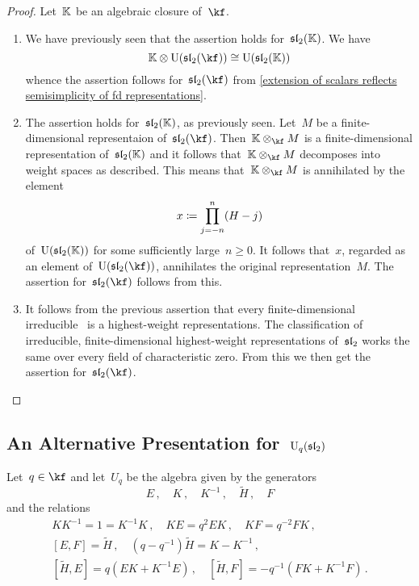 \documentclass[a4paper, 11pt, oneside]{scrartcl}
\begin{document}
\begin{proof}
  Let~$\mathbb{K}$ be an algebraic closure of~$\kf$.
  \begin{enumerate}
    \item
      We have previously seen that the assertion holds for~$\mathfrak{sl}_2(\mathbb{K})$.
      We have
      \[
        \Kf \tensor \Univ(\sllie_2(\kf))
        \cong
        \Univ(\sllie_2(\Kf))
      \]
      whence the assertion follows for~$\sllie_2(\kf)$ from \cref{extension of scalars reflects semisimplicity of fd representations}.
    \item
      The assertion holds for~$\mathfrak{sl}_2(\mathbb{K})$, as previously seen.
      Let~$M$ be a finite-dimensional representaion of~$\sllie_2(\kf)$.
      Then~$\Kf \tensor_{\kf} M$ is a finite-dimensional representation of~$\mathfrak{sl}_2(\mathbb{K})$ and it follows that~$\Kf \tensor_{\kf} M$ decomposes into weight spaces as described.
      This means that~$\Kf \tensor_{\kf} M$ is annihilated by the element
      \[
        x \coloneqq \prod_{j=-n}^n (H - j)
      \]
      of~$\operatorname{U}(\mathfrak{sl}_2(\mathbb{K}))$ for some sufficiently large~$n \geq 0$.
      It follows that~$x$, regarded as an element of~$\Univ(\sllie_2(\kf))$, annihilates the original representation~$M$.
      The assertion for~$\sllie_2(\kf)$ follows from this.
    \item
      It follows from the previous assertion that every finite-dimensional irreducible~ is a highest-weight representations.
      The classification of irreducible, finite-dimensional highest-weight representations of~$\mathfrak{sl}_2$ works the same over every field of characteristic zero.
      From this we then get the assertion for~$\sllie_2(\kf)$.
    \qedhere
  \end{enumerate}
\end{proof}



\subsection{An Alternative Presentation for~\texorpdfstring{$\operatorname{U}_q(\mathfrak{sl}_2)$}{Uq(sl2)}}
\label{alternative presentation for quantum sl2}

Let~$q \in \kf$ and let~$U_q$ be the algebra given by the generators
\[
  E \,,
  \quad
  K \,,
  \quad
  K^{-1}  \,,
  \quad
  \widetilde{H} \,,
  \quad
  F
\]
and the relations
\begin{gather*}
  K K^{-1} = 1 = K^{-1} K \,,
  \quad
  KE = q^2 EK \,,
  \quad
  KF = q^{-2} FK \,,
  \\
  [E,F] = \widetilde{H} \,,
  \quad
  (q - q^{-1}) \widetilde{H} = K - K^{-1} \,,
  \\
  [\widetilde{H}, E] = q(EK + K^{-1} E) \,,
  \quad
  [\widetilde{H}, F] = -q^{-1}(FK + K^{-1} F) \,.
\end{gather*}
\end{document}
